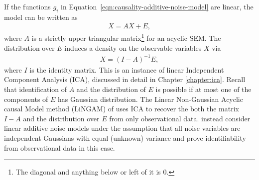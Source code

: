 If the functions $g_i$ in Equation~\ref{eqn:causality-additive-noise-model} are linear, the model can be written as
%
\begin{align}\label{eqn:causality-linear-additive-noise-model}
X = AX + E,
\end{align}
%
where $A$ is a strictly upper triangular matrix\footnote{The diagonal and anything below or left of it is 0.} for an acyclic SEM. 
The distribution over $E$ induces a density on the observable variables $X$ via
%
\begin{align*}
X = (I-A)^{-1} E,
\end{align*}
%
where $I$ is the identity matrix. 
This is an instance of linear Independent Component Analysis (ICA), discussed in detail in Chapter \ref{chapter:ica}. %
Recall that identification of $A$ and the distribution of $E$ is possible if at most one of the components of $E$ has Gaussian distribution.
The Linear Non-Gaussian Acyclic causal Model method (LiNGAM) of \cite{shimizu2006linear} uses ICA to recover the both the matrix $I-A$ and the distribution over $E$ from only observational data.
\cite{peters2013identifiability} instead consider linear additive noise models under the assumption that all noise variables are independent Gaussians with equal (unknown) variance and prove identifiability from observational data in this case. 

